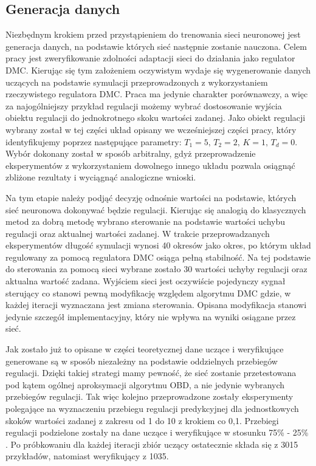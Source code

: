 \subsection{Generacja danych}
Niezbędnym krokiem przed przystąpieniem do trenowania sieci neuronowej jest generacja danych, na podstawie których sieć następnie zostanie nauczona. Celem pracy jest zweryfikowanie zdolności adaptacji sieci do działania jako regulator DMC. Kierując się tym założeniem oczywistym wydaje się wygenerowanie danych uczących na podstawie symulacji przeprowadzonych z wykorzystaniem rzeczywistego regulatora DMC. Praca ma jedynie charakter porównawczy, a więc za najogólniejszy przykład regulacji możemy wybrać dostosowanie wyjścia obiektu regulacji do jednokrotnego skoku wartości zadanej. Jako obiekt regulacji wybrany został w tej części układ opisany we wcześniejszej części pracy, który identyfikujemy poprzez następujące parametry: \( T_1=5, \, T_2=2, \, K=1, \, T_d=0 \). Wybór dokonany został w sposób arbitralny, gdyż przeprowadzenie eksperymentów z wykorzystaniem dowolnego innego układu pozwala osiągnąć zbliżone rezultaty i wyciągnąć analogiczne wnioski.
\par Na tym etapie należy podjąć decyzję odnośnie wartości na podstawie, których sieć neuronowa dokonywać będzie regulacji. Kierując się analogią do klasycznych metod za dobrą metodę wybrano sterowanie na podstawie wartości uchybu regulacji oraz aktualnej wartości zadanej. W trakcie przeprowadzanych eksperymentów długość symulacji wynosi 40 okresów jako okres, po którym układ regulowany za pomocą regulatora DMC osiąga pełną stabilność. Na tej podstawie do sterowania za pomocą sieci wybrane zostało 30 wartości uchyby regulacji oraz aktualna wartość zadana. Wyjściem sieci jest oczywiście pojedynczy sygnał sterujący co stanowi pewną modyfikację względem algorytmu DMC gdzie, w każdej iteracji wyznaczana jest zmiana sterowania. Opisana modyfikacja stanowi jedynie szczegół implementacyjny, który nie wpływa na wyniki osiągane przez sieć.
\par Jak zostało już to opisane w części teoretycznej dane uczące i weryfikujące generowane są w sposób niezależny na podstawie oddzielnych przebiegów regulacji. Dzięki takiej strategi mamy pewność, że sieć zostanie przetestowana pod kątem ogólnej aproksymacji algorytmu OBD, a nie jedynie wybranych przebiegów regulacji. Tak więc kolejno przeprowadzone zostały eksperymenty polegające na wyznaczeniu przebiegu regulacji predykcyjnej dla jednostkowych skoków wartości zadanej z zakresu od 1 do 10 z krokiem co 0,1. Przebiegi regulacji podzielone zostały na dane uczące i weryfikujące w stosunku 75\% - 25\% . Po próbkowaniu dla każdej iteracji zbiór uczący ostatecznie składa się z 3015 przykładów, natomiast weryfikujący z 1035.
